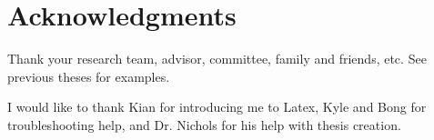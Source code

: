 \chapter*{Acknowledgments} 

Thank your research team, advisor, committee, family and friends, etc.  See previous theses for examples.

I would like to thank Kian for introducing me to Latex, Kyle and Bong for troubleshooting help, and Dr. Nichols for his help with thesis creation.


